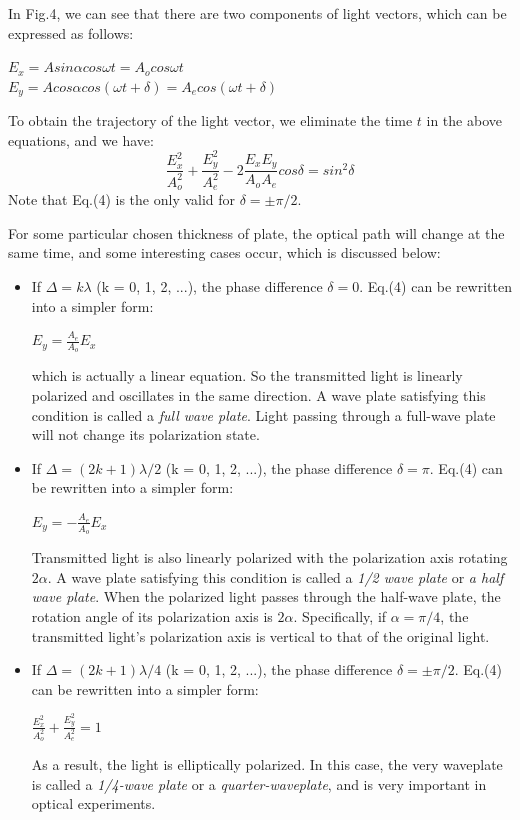 \documentclass[a4paper,12pt]{article}
\begin{document}
In Fig.4, we can see that there are two components of light vectors, which can be expressed as follows:
\begin{center}
$E_x= A sin\alpha cos\omega t = A_o cos\omega t$\\
$E_y= A cos\alpha cos(\omega t+\delta) = A_e cos(\omega t+\delta)$
\end{center}

To obtain the trajectory of the light vector, we eliminate the time $t$ in the above equations, and we have:
\begin{equation}
\displaystyle \frac{E_x^2}{A_o^2} + \frac{E_y^2}{A_e^2} - 2\frac{E_x E_y}{A_o A_e} cos\delta = sin^2\delta
\end{equation}
Note that Eq.(4) is the only valid for $\delta = \pm \pi/2$.
\par For some particular chosen thickness of plate, the optical path will change at the same time, and some interesting cases occur, which is discussed below:
\begin{itemize}
\item If $\Delta = k \lambda$ (k = 0, 1, 2, ...), the phase difference $\delta = 0$. Eq.(4) can be rewritten into a simpler form:
	\begin{center}
	$ \displaystyle E_y = \frac{A_e}{A_o}E_x$ 
	\end{center}
which is actually a linear equation. So the transmitted light is linearly polarized and oscillates in the same direction. A wave plate satisfying this condition is called a \textit{full wave plate}. Light passing through a full-wave plate will not change its polarization state.

\item If $\Delta = (2k+1) \lambda/2$ (k = 0, 1, 2, ...), the phase difference $\delta = \pi$. Eq.(4) can be rewritten into a simpler form:
	\begin{center}
	$ \displaystyle E_y = -\frac{A_e}{A_o}E_x$ 
	\end{center}
Transmitted light is also linearly polarized with the polarization axis rotating $2\alpha$. A wave plate satisfying this condition is called a \textit{1/2 wave plate} or \textit{a half wave plate}. When the polarized light passes through the half-wave plate, the rotation angle of its polarization axis is $2\alpha$. Specifically, if $\alpha= \pi/4$, the transmitted light's polarization axis is vertical to that of the original light.

\item If $\Delta = (2k+1) \lambda/4$ (k = 0, 1, 2, ...), the phase difference $\delta = \pm \pi/2$. Eq.(4) can be rewritten into a simpler form:
	\begin{center}
	$ \displaystyle \frac{E_x^2}{A_o^2} + \frac{E_y^2}{A_e^2} = 1$ 
	\end{center}
As a result, the light is elliptically polarized. In this case, the very waveplate is called a \textit{1/4-wave plate} or a \textit{quarter-waveplate}, and is very important in optical experiments.
\end{itemize} 
\end{document}
